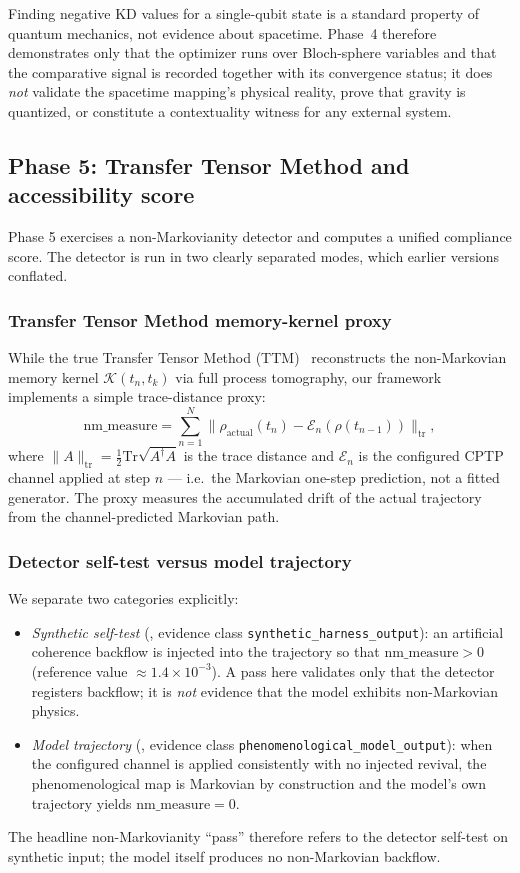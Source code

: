 Finding negative KD values for a single-qubit state is a standard property of quantum mechanics, not evidence about spacetime. Phase~4 therefore demonstrates only that the optimizer runs over Bloch-sphere variables and that the comparative signal is recorded together with its convergence status; it does \emph{not} validate the spacetime mapping's physical reality, prove that gravity is quantized, or constitute a contextuality witness for any external system.

\subsection{Phase 5: Transfer Tensor Method and accessibility score}
Phase 5 exercises a non-Markovianity detector and computes a unified compliance score. The detector is run in two clearly separated modes, which earlier versions conflated.

\subsubsection{Transfer Tensor Method memory-kernel proxy}
While the true Transfer Tensor Method (TTM)~\cite{CerrilloCao2014} reconstructs the non-Markovian memory kernel $\mathcal{K}(t_n, t_k)$ via full process tomography, our framework implements a simple trace-distance proxy:
\begin{equation}
  \text{nm\_measure} = \sum_{n=1}^N \|\rho_{\text{actual}}(t_n) - \mathcal{E}_n(\rho(t_{n-1}))\|_{\text{tr}},
  \label{eq:ttm_proxy}
\end{equation}
where $\|A\|_{\text{tr}} = \frac{1}{2}\text{Tr}\sqrt{A^\dagger A}$ is the trace distance and $\mathcal{E}_n$ is the configured CPTP channel applied at step $n$ --- i.e.\ the Markovian one-step prediction, not a fitted generator. The proxy measures the accumulated drift of the actual trajectory from the channel-predicted Markovian path.

\subsubsection{Detector self-test versus model trajectory}
We separate two categories explicitly:
\begin{itemize}[leftmargin=*]
  \item \emph{Synthetic self-test} (, evidence class \texttt{synthetic\_harness\_output}): an artificial coherence backflow is injected into the trajectory so that $\text{nm\_measure} > 0$ (reference value $\approx 1.4\times10^{-3}$). A pass here validates only that the detector registers backflow; it is \emph{not} evidence that the model exhibits non-Markovian physics.
  \item \emph{Model trajectory} (, evidence class \texttt{phenomenological\_model\_output}): when the configured channel is applied consistently with no injected revival, the phenomenological map is Markovian by construction and the model's own trajectory yields $\text{nm\_measure} = 0$.
\end{itemize}
The headline non-Markovianity ``pass'' therefore refers to the detector self-test on synthetic input; the model itself produces no non-Markovian backflow.

